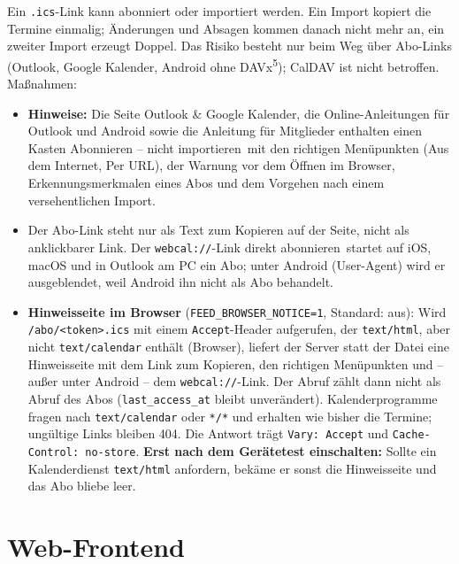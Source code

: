 \documentclass[a4paper,fontsize=10pt]{scrartcl}
\newcommand{\code}[1]{\texttt{#1}}
\begin{document}
Ein \texttt{.ics}-Link kann abonniert oder importiert werden. Ein Import
kopiert die Termine einmalig; Änderungen und Absagen kommen danach nicht mehr
an, ein zweiter Import erzeugt Doppel. Das Risiko besteht nur beim Weg über
Abo-Links (Outlook, Google Kalender, Android ohne DAVx\textsuperscript{5});
CalDAV ist nicht betroffen. Maßnahmen:

\begin{itemize}
  \item \textbf{Hinweise:} Die Seite \glqq Outlook \& Google Kalender\grqq,
        die Online-Anleitungen für Outlook und Android sowie die Anleitung für
        Mitglieder enthalten einen Kasten \glqq Abonnieren -- nicht
        importieren\grqq\ mit den richtigen Menüpunkten (\glqq Aus dem
        Internet\grqq, \glqq Per URL\grqq), der Warnung vor dem Öffnen im
        Browser, Erkennungsmerkmalen eines Abos und dem Vorgehen nach einem
        versehentlichen Import.
  \item Der Abo-Link steht nur als Text zum Kopieren auf der Seite, nicht als
        anklickbarer Link. Der \code{webcal://}-Link \glqq direkt
        abonnieren\grqq\ startet auf iOS, macOS und in Outlook am PC ein Abo;
        unter Android (User-Agent) wird er ausgeblendet, weil Android ihn
        nicht als Abo behandelt.
  \item \textbf{Hinweisseite im Browser} (\code{FEED\_BROWSER\_NOTICE=1},
        Standard: aus): Wird \code{/abo/<token>.ics} mit einem
        \code{Accept}-Header aufgerufen, der \code{text/html}, aber nicht
        \code{text/calendar} enthält (Browser), liefert der Server statt der
        Datei eine Hinweisseite mit dem Link zum Kopieren, den richtigen
        Menüpunkten und -- außer unter Android -- dem \code{webcal://}-Link.
        Der Abruf zählt dann nicht als Abruf des Abos
        (\code{last\_access\_at} bleibt unverändert). Kalenderprogramme
        fragen nach \code{text/calendar} oder \code{*/*} und erhalten wie
        bisher die Termine; ungültige Links bleiben 404. Die Antwort trägt
        \code{Vary: Accept} und \code{Cache-Control: no-store}.
        \textbf{Erst nach dem Gerätetest einschalten:} Sollte ein
        Kalenderdienst \code{text/html} anfordern, bekäme er sonst die
        Hinweisseite und das Abo bliebe leer.
\end{itemize}

\section{Web-Frontend}
\end{document}
